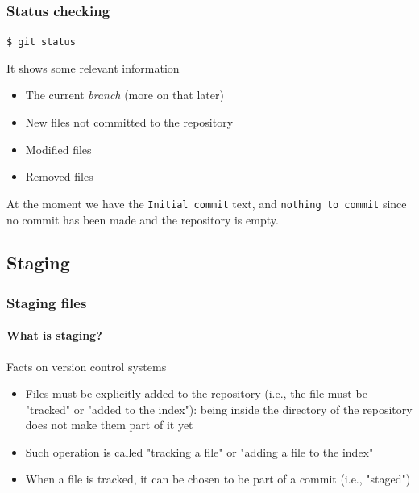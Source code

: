 \begin{frame}
\frametitle{Status checking}

\texttt{\$ git status}

\bigskip
\begin{block}{It shows some relevant information}
\begin{itemize}
\item The current {\em branch} (more on that later)
\item New files not committed to the repository
\item Modified files
\item Removed files
\end{itemize}
At the moment we have the \texttt{Initial commit} text, and \texttt{nothing to commit} since no commit has been made and the repository is empty.
\end{block}

\end{frame}

\subsection{Staging}

\begin{frame}
\frametitle{Staging files}
\framesubtitle{What is staging?}

\begin{block}{Facts on version control systems}
\begin{itemize}
\item Files must be explicitly added to the repository (i.e., the file must be "tracked" or "added to the index"): being inside the directory of the repository does not make them part of it yet 
\item Such operation is called "tracking a file" or "adding a file to the index"
\item When a file is tracked, it can be chosen to be part of a commit (i.e., "staged")
\end{itemize}
\end{block}

\end{frame}

